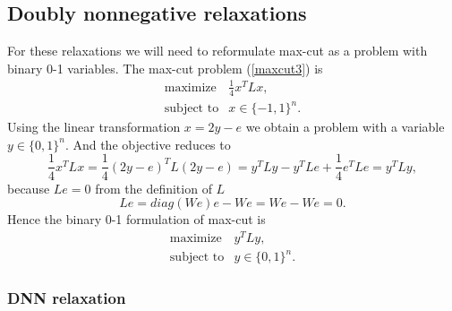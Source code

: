 \documentclass[12pt]{book}
\theoremstyle{definition}
\begin{document}

\subsection{Doubly nonnegative relaxations}
For these relaxations we will need to reformulate max-cut as a problem with binary 0-1 variables. The max-cut problem 
(\ref{maxcut3}) is 
\begin{equation*}
\begin{array}{ll}
\mbox{maximize} & \frac{1}{4}x^TLx, \\
\mbox{subject to} & x\in\{-1,1\}^n .
\end{array}	
\end{equation*}
Using the linear transformation $x = 2y - e$ we obtain a problem with a 	
variable $y\in \{0,1\}^n.$ And the objective reduces to 
$$\frac{1}{4}x^TLx = \frac{1}{4}(2y-e)^TL(2y-e) = y^TLy - y^TLe + \frac{1}{4}e^TLe = y^TLy,$$
because $Le = 0$ from the definition of $L$ 
$$Le = diag(We)e - We = We - We = 0.$$
Hence the binary 0-1 formulation of max-cut is 
\begin{equation}
\label{MaxCut0-1}
\begin{array}{ll}
\mbox{maximize} & y^TLy, \\
\mbox{subject to} & y\in\{0,1\}^n .
\end{array}	
\end{equation}



\subsubsection{DNN relaxation}
\end{document}
